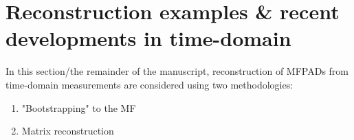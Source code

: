 \section{Reconstruction examples & recent developments in time-domain }

In this section/the remainder of the manuscript, reconstruction of MFPADs from time-domain measurements are considered using two methodologies:

\begin{enumerate}
\item "Bootstrapping" to the MF
\item Matrix reconstruction
\end{enumerate}